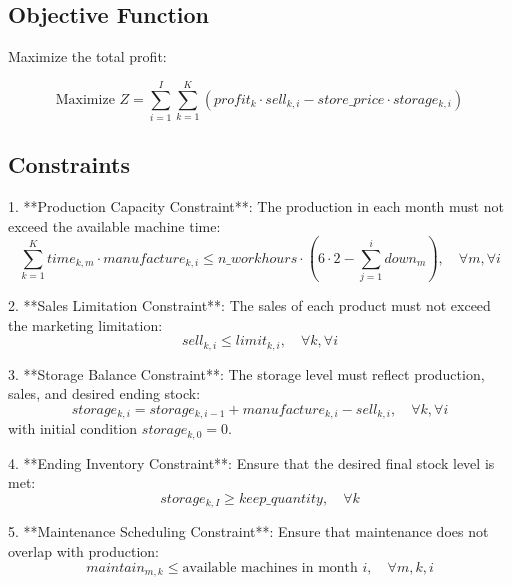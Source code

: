 \documentclass{article}
\begin{document}
\subsection*{Objective Function}
Maximize the total profit:

\[
\text{Maximize } Z = \sum_{i=1}^{I} \sum_{k=1}^{K} \left( profit_k \cdot sell_{k,i} - store\_price \cdot storage_{k,i} \right)
\]

\subsection*{Constraints}
1. **Production Capacity Constraint**:
   The production in each month must not exceed the available machine time:
   \[
   \sum_{k=1}^{K} time_{k,m} \cdot manufacture_{k,i} \leq n\_workhours \cdot (6 \cdot 2 - \sum_{j=1}^{i} down_m), \quad \forall m, \forall i
   \]

2. **Sales Limitation Constraint**:
   The sales of each product must not exceed the marketing limitation:
   \[
   sell_{k,i} \leq limit_{k,i}, \quad \forall k, \forall i
   \]

3. **Storage Balance Constraint**:
   The storage level must reflect production, sales, and desired ending stock:
   \[
   storage_{k,i} = storage_{k,i-1} + manufacture_{k,i} - sell_{k,i}, \quad \forall k, \forall i
   \]
   with initial condition \(storage_{k,0} = 0\).

4. **Ending Inventory Constraint**:
   Ensure that the desired final stock level is met:
   \[
   storage_{k,I} \geq keep\_quantity, \quad \forall k
   \]

5. **Maintenance Scheduling Constraint**:
   Ensure that maintenance does not overlap with production:
   \[
   maintain_{m,k} \leq \text{available machines in month } i, \quad \forall m, k, i
   \]
\end{document}

